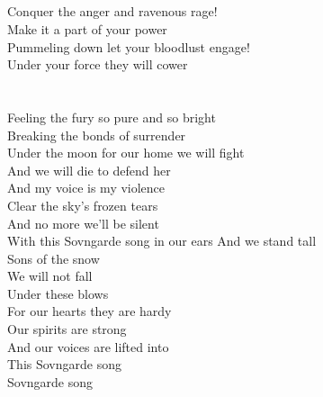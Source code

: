 \begin{flushleft}
\tab{}\tab{}\\
\tab{}\tab{}\\
\tab{}\tab{}\\
\tab{}\tab{}\\
\hops
Conquer the anger and ravenous rage! \\
Make it a part of your power \tab{}\\
Pummeling down let your bloodlust engage! \\
Under your force they will cower \\
\tab{}\tab{}\\
\tab{}\tab{}\\
Feeling the fury so pure and so bright \\
Breaking the bonds of surrender \\
Under the moon for our home we will fight \\
And we will die to defend her \tab{}\\
\hops
\hspace{0.9cm}And my voice is my violence\\
\hspace{0.9cm}Clear the sky's frozen tears\\
\hspace{0.9cm}And no more we'll be silent\\
\hspace{0.9cm}With this Sovngarde song in our ears
\hop
\hspace{1.8cm}And we stand tall\\
\hspace{1.8cm}Sons of the snow\\
\hspace{1.8cm}We will not fall\\
\hspace{1.8cm}Under these blows\\
\hspace{1.8cm}For our hearts they are hardy\\
\hspace{1.8cm}Our spirits are strong\\
\hspace{1.8cm}And our voices are lifted into\\
\hspace{1.8cm}This Sovngarde song \\
\hspace{1.8cm}Sovngarde song \tab{}\\

\end{flushleft}
